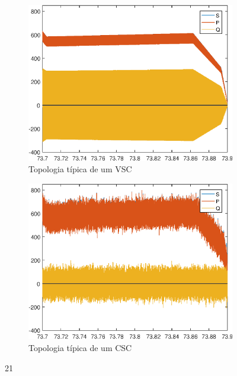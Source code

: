 \begin{figure}[!htb] %
	\centering
	\begin{subfigure}[b]{0.48\textwidth}
		\centering
		\includegraphics[width=\textwidth]{Cap4/Figuras/resultados_unfilt_21.eps}
		\caption{Topologia típica de um VSC} 
		\label{fig:resultados_unfilt_21.eps}
	\end{subfigure}%
		\hfill
	\begin{subfigure}[b]{0.48\textwidth}  
		\centering 
		\includegraphics[width=\textwidth]{Cap4/Figuras/resultados_filt_21.eps}
		\caption{Topologia típica de um CSC}    
		\label{fig:resultados_filt_21.eps}
	\end{subfigure}%
	\caption{21}
	\label{fig:21}
\end{figure}


